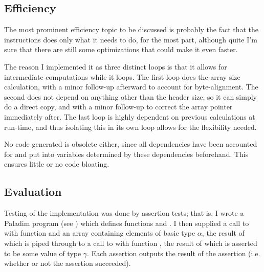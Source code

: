 \newpage
\subsection{Efficiency}
The most prominent efficiency topic to be discussed is probably the fact that
the instructions does only what it needs to do, for the most part, although
quite I'm sure that there are still some optimizations that could make it even
faster.

The reason I implemented it as three distinct loops is that it allows for
intermediate computations while it loops. The first loop does the array size
calculation, with a minor follow-up afterward to account for byte-alignment.
The second does not depend on anything other than the header size, so it can
simply do a direct copy, and with a minor follow-up to correct the array
pointer immediately after. The last loop is highly dependent on previous
calculations at run-time, and thus isolating this in its own loop allows for
the flexibility needed.

No code generated is obsolete either, since all dependencies have been
accounted for and put into variables determined by these dependencies
beforehand. This ensures little or no code bloating.

\subsection{Evaluation}
Testing of the implementation was done by assertion tests; that is, I wrote a
Paladim program (see ) which
defines functions  and . I then supplied a call to  with function  and an
array containing elements of basic type $\alpha$, the result of which is piped
through to a call to  with function , the result of which is
asserted to be some value of type $\gamma$. Each assertion outputs the result
of the assertion (i.e. whether or not the assertion succeeded).

